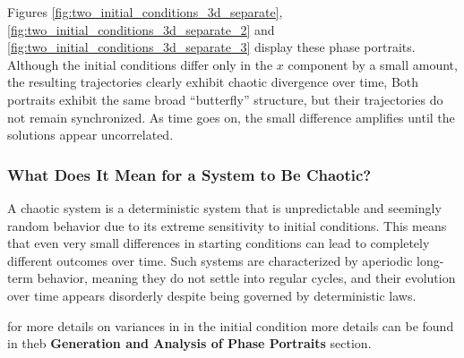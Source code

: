 Figures \ref{fig:two_initial_conditions_3d_separate}, \ref{fig:two_initial_conditions_3d_separate_2} and \ref{fig:two_initial_conditions_3d_separate_3} display these phase portraits. Although the initial conditions differ only in the $x$ component by a small amount, the resulting trajectories clearly exhibit chaotic divergence over time, Both portraits exhibit the same broad “butterfly” structure, but their trajectories do not remain synchronized. As time goes on, the small difference amplifies until the solutions appear uncorrelated.

\subsubsection{What Does It Mean for a System to Be Chaotic?}
A chaotic system is a deterministic system that is unpredictable and seemingly random behavior due to its extreme sensitivity to initial conditions. This means that even very small differences in starting conditions can lead to completely different outcomes over time. Such systems are characterized by aperiodic long-term behavior, meaning they do not settle into regular cycles, and their evolution over time appears disorderly despite being governed by deterministic laws.

for more details on variances in in the initial condition more details can be found in theb \textbf{Generation and Analysis of Phase Portraits} section.